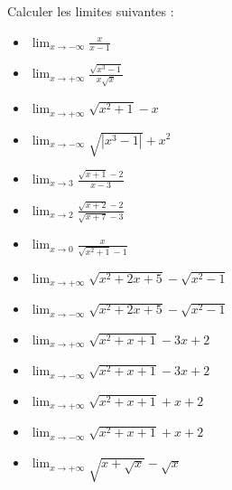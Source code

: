       \begin{exo}
\label{exo:fn limites2}
      Calculer les limites suivantes : \\[\baselineskip]
                  \begin{itemize}
                        \item $ \lim_{x\rightarrow -\infty} \frac{x}{x-1} $
                        \item $ \lim_{x\rightarrow +\infty} \frac{\sqrt{x^3 - 1}}{x \sqrt{x}} $
                        \item $ \lim_{x\rightarrow +\infty} \sqrt{x^2 + 1} - x $
                        \item $ \lim_{x\rightarrow -\infty} \sqrt{|x^3 - 1|} + x^2 $
                        \item $ \lim_{x\rightarrow 3} \frac{\sqrt{x+1}-2}{x-3} $
                        \item $ \lim_{x\rightarrow 2} \frac{\sqrt{x+2}-2}{\sqrt{x+7}-3} $
                        \item $ \lim_{x\rightarrow 0} \frac{x}{\sqrt{x^2+1} - 1} $
                        \item $ \lim_{x\rightarrow +\infty} \sqrt{x^2+2x+5}-\sqrt{x^2-1} $
                        \item $ \lim_{x\rightarrow -\infty} \sqrt{x^2+2x+5}-\sqrt{x^2-1} $
                        \item $ \lim_{x\rightarrow +\infty} \sqrt{x^2+x+1}-3x+2 $
                        \item $ \lim_{x\rightarrow -\infty} \sqrt{x^2+x+1}-3x+2 $
                        \item $ \lim_{x\rightarrow +\infty} \sqrt{x^2+x+1}+x+2 $
                        \item $ \lim_{x\rightarrow -\infty} \sqrt{x^2+x+1}+x+2 $
                        \item $ \lim_{x\rightarrow +\infty} \sqrt{x+\sqrt{x}} - \sqrt{x} $            
                  \end{itemize}
      \end{exo}
